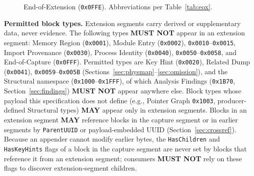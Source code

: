 \documentclass[11pt,a4paper]{article}
\newcommand{\MUSTNOT}{\textbf{MUST NOT}}
\newcommand{\MAY}{\textbf{MAY}}
\newcommand{\hex}[1]{\texttt{0x#1}}
\newcommand{\field}[1]{\texttt{#1}}
\begin{document}
\begin{figure}[H]\centering
{}
\caption{End-of-Extension (\hex{0FFE}). Abbreviations per Table~\ref{tab:eox}.}\label{fig:eox-payload}\end{figure}

\noindent\textbf{Permitted block types.} Extension segments carry derived or supplementary data, never evidence. The following types \MUSTNOT{} appear in an extension segment: Memory Region (\hex{0001}), Module Entry (\hex{0002}), \hex{0010}--\hex{0015}, Import Provenance (\hex{0030}), Process Identity (\hex{0040}), \hex{0050}--\hex{0058}, and End-of-Capture (\hex{0FFF}). Permitted types are Key Hint (\hex{0020}), Related Dump (\hex{0041}), \hex{0059}--\hex{005B} (Sections~\ref{sec:physmap}--\ref{sec:omission}), and the Structural namespace (\hex{1000}--\hex{1FFF}), of which Analysis Findings (\hex{1B70}, Section~\ref{sec:findings}) \MUSTNOT{} appear anywhere else. Block types whose payload this specification does not define (e.g., Pointer Graph \hex{1003}, producer-defined Structural types) \MAY{} appear only in extension segments. Blocks in an extension segment \MAY{} reference blocks in the capture segment or in earlier segments by \field{ParentUUID} or payload-embedded UUID (Section~\ref{sec:crossref}). Because an appender cannot modify earlier bytes, the \field{HasChildren} and \field{HasKeyHints} flags of a block in the capture segment are never set by blocks that reference it from an extension segment; consumers \MUSTNOT{} rely on these flags to discover extension-segment children.
\end{document}
